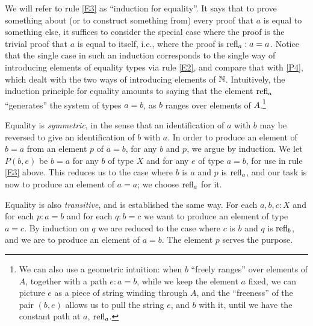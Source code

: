 We will refer to rule \ref{E3} as ``induction for equality''.  It says that to prove something about (or to construct something from) every proof that
$a$ is equal to something else, it suffices to consider the special case where the proof is the trivial proof that $a$ is equal to itself, i.e.,
where the proof is $\mathrm{refl}_{a} : a=a$.  Notice that the single case in such an induction corresponds to the single way of introducing elements of
equality types via rule \ref{E2}, and compare that with \ref{P4}, which dealt with the two ways of introducing elements of $\mathbb{N}$.
Intuitively, the induction principle for equality amounts to saying that the element $\mathrm{refl}_{a}$ ``generates'' the system of types $a=b$, as $b$
ranges over elements of $A$.\footnote{%
  We can also use a geometric intuition: when $b$ ``freely ranges'' over elements of $A$,
  together with a path $e : a=b$,
  while we keep the element $a$ fixed, we can picture $e$ as a piece of string
  winding through $A$, and the ``freeness'' of the pair $(b,e)$ allows us to pull the string $e$,
  and $b$ with it, until we have the constant path at $a$, $\mathrm{refl}_{a}$.\par
  }

Equality is \emph{symmetric}, in the sense that an identification of $a$ with $b$ may be reversed to give an identification of $b$ with $a$.  In
order to produce an element of $b=a$ from an element $p$ of $a=b$, for any $b$ and $p$, we argue by induction.  We let $P(b,e)$ be $b=a$ for any
$b$ of type $X$ and for any $e$ of type $a=b$, for use in rule \ref{E3} above. 
This reduces us to the case where $b$ is $a$ and $p$ is $\mathrm{refl}_{a}$, and
our task is now to produce an element of $a=a$; we choose $\mathrm{refl}_{a}$ for it.

Equality is also \emph{transitive}, and is established the same way.  
For each $a,b,c:X$ and for each $p:a=b$ and for each $q:b=c$ we want to produce an
element of type $a=c$.  By induction on $q$ we are reduced to the case where $c$ is $b$ and $q$ is $\mathrm{refl}_{b}$, and we are to produce an element
of $a=b$.  The element $p$ serves the purpose.  


